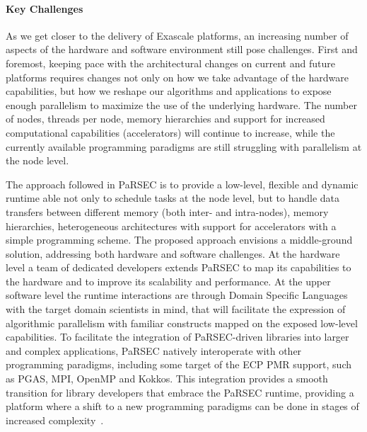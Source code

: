 \paragraph{Key Challenges}

As we get closer to the delivery of Exascale platforms, an increasing number of
aspects of the hardware and software environment still pose challenges. First
and foremost, keeping pace with the architectural changes on current and future
platforms requires changes not only on how we take advantage of the hardware
capabilities, but how we reshape our algorithms and applications to expose
enough parallelism to maximize the use of the underlying hardware. The number of
nodes, threads per node, memory hierarchies and support for increased
computational capabilities (accelerators) will continue to increase, while the
currently available programming paradigms are still struggling with parallelism
at the node level.


The approach followed in PaRSEC is to provide a low-level, flexible and dynamic
runtime able not only to schedule tasks at the node level, but to handle data
transfers between different memory (both inter- and intra-nodes), memory
hierarchies, heterogeneous architectures with support for accelerators with a
simple programming scheme. The proposed approach envisions a middle-ground
solution, addressing both hardware and software challenges. At the hardware
level a team of dedicated developers extends PaRSEC to map its capabilities to
the hardware and to improve its scalability and performance. At the upper
software level the runtime interactions are through Domain Specific Languages
with the target domain scientists in mind, that will facilitate the expression
of algorithmic parallelism with familiar constructs mapped on the exposed
low-level capabilities. To facilitate the integration of PaRSEC-driven libraries
into larger and complex applications, PaRSEC natively interoperate with other
programming paradigms, including some target of the ECP PMR support, such as
PGAS, MPI, OpenMP and Kokkos. This integration provides a smooth transition for
library developers that embrace the PaRSEC runtime, providing a platform where a
shift to a new programming paradigms can be done in stages of increased
complexity~\cite{lorapo-protools,BLR_LU,parsec_pdgemm}.


